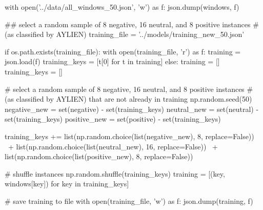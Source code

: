 
\begin{pyin}
with open('../data/all_windows_50.json', 'w') as f:
    json.dump(windows, f)
\end{pyin}


\begin{pyin}
\## select a random sample of 8 negative, 16 neutral, and 8 positive instances
# (as classified by AYLIEN)
training_file = '../models/training_new_50.json'

if os.path.exists(training_file):
    with open(training_file, 'r') as f:
        training = json.load(f)
    training_keys = [t[0] for t in training]
else:
    training = []
    training_keys = []

# select a random sample of 8 negative, 16 neutral, and 8 positive instances
# (as classified by AYLIEN) that are not already in training
np.random.seed(50)
negative_new = set(negative) - set(training_keys)
neutral_new = set(neutral) - set(training_keys)
positive_new = set(positive) - set(training_keys)

training_keys += list(np.random.choice(list(negative_new), 8, replace=False)) \
                + list(np.random.choice(list(neutral_new), 16, replace=False)) \
                + list(np.random.choice(list(positive_new), 8, replace=False))

# shuffle instances
np.random.shuffle(training_keys)
training = [(key, windows[key]) for key in training_keys]

# save training to file
with open(training_file, 'w') as f:
    json.dump(training, f)
\end{pyin}


\begin{pyin}

\end{pyin}
